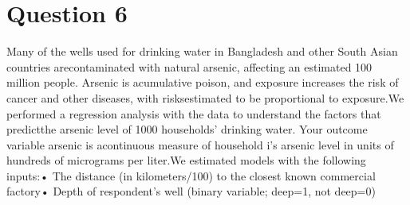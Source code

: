\documentclass[12pt,letterpaper]{article}
\begin{document}
		\section*{Question 6}
\vspace{.25cm}
\noindent 
Many of the wells used for drinking water in Bangladesh and other South Asian countries arecontaminated with natural arsenic, affecting an estimated 100 million people. Arsenic is acumulative poison, and exposure increases the risk of cancer and other diseases, with risksestimated to be proportional to exposure.We performed a regression analysis with the data to understand the factors that predictthe arsenic level of 1000 households’ drinking water. Your outcome variable arsenic is acontinuous measure of household i’s arsenic level in units of hundreds of micrograms per liter.We estimated models with the following inputs:• The distance (in kilometers/100) to the closest known commercial factory• Depth of respondent’s well (binary variable; deep=1, not deep=0)
\end{document}
